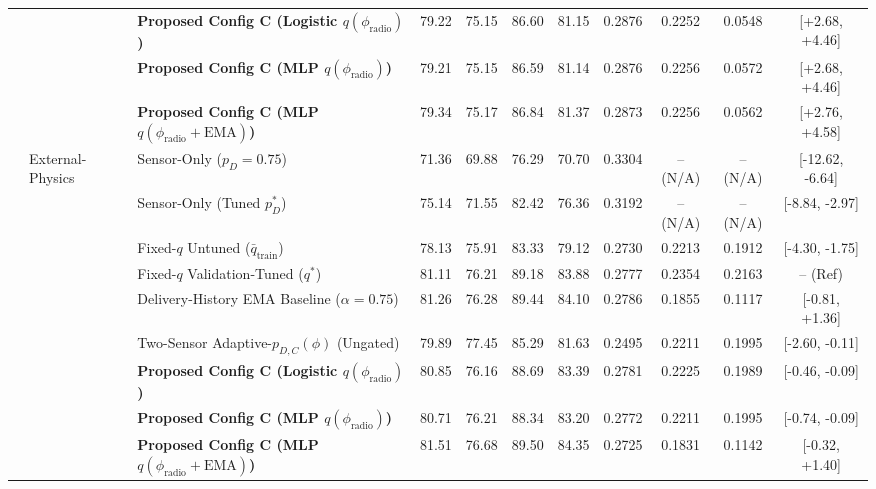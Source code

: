 \begin{table}[!t]
\begin{tabular}{lllcccccccc}
 &  & \textbf{Proposed Config C (Logistic $q(\phi_{\text{radio}})$)} & 79.22 & 75.15 & 86.60 & 81.15 & 0.2876 & 0.2252 & 0.0548 & [+2.68, +4.46] \\
 &  & \textbf{Proposed Config C (MLP $q(\phi_{\text{radio}})$)} & 79.21 & 75.15 & 86.59 & 81.14 & 0.2876 & 0.2256 & 0.0572 & [+2.68, +4.46] \\
 &  & \textbf{Proposed Config C (MLP $q(\phi_{\text{radio}}+\text{EMA})$)} & 79.34 & 75.17 & 86.84 & 81.37 & 0.2873 & 0.2256 & 0.0562 & [+2.76, +4.58] \\
\midrule
 & External-Physics & Sensor-Only ($p_D=0.75$) & 71.36 & 69.88 & 76.29 & 70.70 & 0.3304 & -- (N/A) & -- (N/A) & [-12.62, -6.64] \\
 &  & Sensor-Only (Tuned $p_D^*$) & 75.14 & 71.55 & 82.42 & 76.36 & 0.3192 & -- (N/A) & -- (N/A) & [-8.84, -2.97] \\
 &  & Fixed-$q$ Untuned ($\bar{q}_{\text{train}}$) & 78.13 & 75.91 & 83.33 & 79.12 & 0.2730 & 0.2213 & 0.1912 & [-4.30, -1.75] \\
 &  & Fixed-$q$ Validation-Tuned ($q^*$) & 81.11 & 76.21 & 89.18 & 83.88 & 0.2777 & 0.2354 & 0.2163 & -- (Ref) \\
 &  & Delivery-History EMA Baseline ($\alpha=0.75$) & 81.26 & 76.28 & 89.44 & 84.10 & 0.2786 & 0.1855 & 0.1117 & [-0.81, +1.36] \\
 &  & Two-Sensor Adaptive-$p_{D,C}(\phi)$ (Ungated) & 79.89 & 77.45 & 85.29 & 81.63 & 0.2495 & 0.2211 & 0.1995 & [-2.60, -0.11] \\
 &  & \textbf{Proposed Config C (Logistic $q(\phi_{\text{radio}})$)} & 80.85 & 76.16 & 88.69 & 83.39 & 0.2781 & 0.2225 & 0.1989 & [-0.46, -0.09] \\
 &  & \textbf{Proposed Config C (MLP $q(\phi_{\text{radio}})$)} & 80.71 & 76.21 & 88.34 & 83.20 & 0.2772 & 0.2211 & 0.1995 & [-0.74, -0.09] \\
 &  & \textbf{Proposed Config C (MLP $q(\phi_{\text{radio}}+\text{EMA})$)} & 81.51 & 76.68 & 89.50 & 84.35 & 0.2725 & 0.1831 & 0.1142 & [-0.32, +1.40] \\
\bottomrule
\end{tabular}
\end{table}